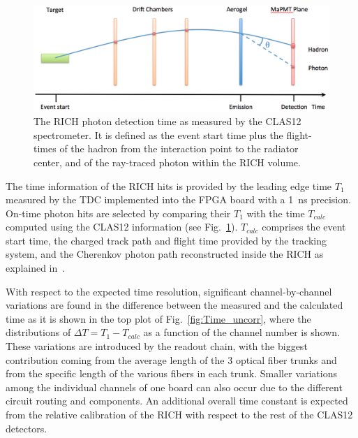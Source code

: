 \documentclass[5p,times,twocolumn]{elsarticle}
\begin{document}
\begin{figure}[t]
\begin{center}
\includegraphics[width=1.0\columnwidth]{Tracking_time.png}
\end{center}
\caption{The RICH photon detection time as measured by the  CLAS12 spectrometer. It is defined as the event start time plus the flight-times of the hadron from the interaction point to the radiator center, and of the ray-traced photon within the RICH volume.}
\label{Fig:Traced_Time}
\end{figure}

The time information of the RICH hits is provided by the leading edge time $T_1$ measured by the TDC implemented into the FPGA board with a 1~ns precision. On-time photon hits are selected by comparing their $T_1$ with the time $T_{calc}$ computed using the CLAS12 information (see Fig.~\ref{Fig:Traced_Time}). $T_{calc}$ comprises the event start time, the charged track path and flight time provided by the tracking system, and the Cherenkov photon path reconstructed inside the RICH as explained in~\cite{Ref:CLASREC}. 

With respect to the expected time resolution, significant channel-by-channel variations are found in the difference between the measured and the calculated time as it is shown in the top plot of Fig.~\ref{fig:Time_uncorr}, where the distributions of $\Delta T=T_1-T_{calc}$ as a function of the channel number is shown. These variations are introduced by the readout chain, with the biggest contribution coming from the average length of the 3 optical fiber trunks and from the specific length of the various fibers in each trunk. Smaller variations among the individual channels of one board can also occur due to the different circuit routing and components. An additional overall time constant is expected from the relative calibration of the RICH with respect to the rest of the CLAS12 detectors.
\end{document}
